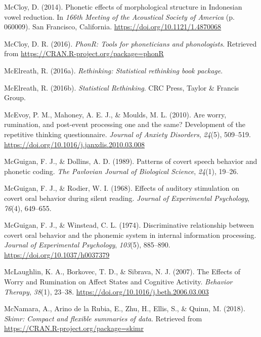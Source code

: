 \documentclass[a4paper,12pt,twoside,openright,oldfontcommands,final]{memoir}
\begin{document}
\leavevmode\hypertarget{ref-mccloy_phonetic_2014}{}%
McCloy, D. (2014). Phonetic effects of morphological structure in Indonesian vowel reduction. In \emph{166th Meeting of the Acoustical Society of America} (p. 060009). San Francisco, California. \url{https://doi.org/10.1121/1.4870068}

\leavevmode\hypertarget{ref-R-phonR}{}%
McCloy, D. R. (2016). \emph{PhonR: Tools for phoneticians and phonologists}. Retrieved from \url{https://CRAN.R-project.org/package=phonR}

\leavevmode\hypertarget{ref-R-rethinking}{}%
McElreath, R. (2016a). \emph{Rethinking: Statistical rethinking book package}.

\leavevmode\hypertarget{ref-mcelreath_statistical_2016}{}%
McElreath, R. (2016b). \emph{Statistical Rethinking}. CRC Press, Taylor \& Francis Group.

\leavevmode\hypertarget{ref-McEvoy2010}{}%
McEvoy, P. M., Mahoney, A. E. J., \& Moulds, M. L. (2010). Are worry, rumination, and post-event processing one and the same? Development of the repetitive thinking questionnaire. \emph{Journal of Anxiety Disorders}, \emph{24}(5), 509--519. \url{https://doi.org/10.1016/j.janxdis.2010.03.008}

\leavevmode\hypertarget{ref-mcguigan_patterns_1989}{}%
McGuigan, F. J., \& Dollins, A. D. (1989). Patterns of covert speech behavior and phonetic coding. \emph{The Pavlovian Journal of Biological Science}, \emph{24}(1), 19--26.

\leavevmode\hypertarget{ref-mcguigan_effects_1968}{}%
McGuigan, F. J., \& Rodier, W. I. (1968). Effects of auditory stimulation on covert oral behavior during silent reading. \emph{Journal of Experimental Psychology}, \emph{76}(4), 649--655.

\leavevmode\hypertarget{ref-mcguigan_discriminative_1974}{}%
McGuigan, F. J., \& Winstead, C. L. (1974). Discriminative relationship between covert oral behavior and the phonemic system in internal information processing. \emph{Journal of Experimental Psychology}, \emph{103}(5), 885--890. \url{https://doi.org/10.1037/h0037379}

\leavevmode\hypertarget{ref-mclaughlin_effects_2007}{}%
McLaughlin, K. A., Borkovec, T. D., \& Sibrava, N. J. (2007). The Effects of Worry and Rumination on Affect States and Cognitive Activity. \emph{Behavior Therapy}, \emph{38}(1), 23--38. \url{https://doi.org/10.1016/j.beth.2006.03.003}

\leavevmode\hypertarget{ref-R-skimr}{}%
McNamara, A., Arino de la Rubia, E., Zhu, H., Ellis, S., \& Quinn, M. (2018). \emph{Skimr: Compact and flexible summaries of data}. Retrieved from \url{https://CRAN.R-project.org/package=skimr}
\end{document}
